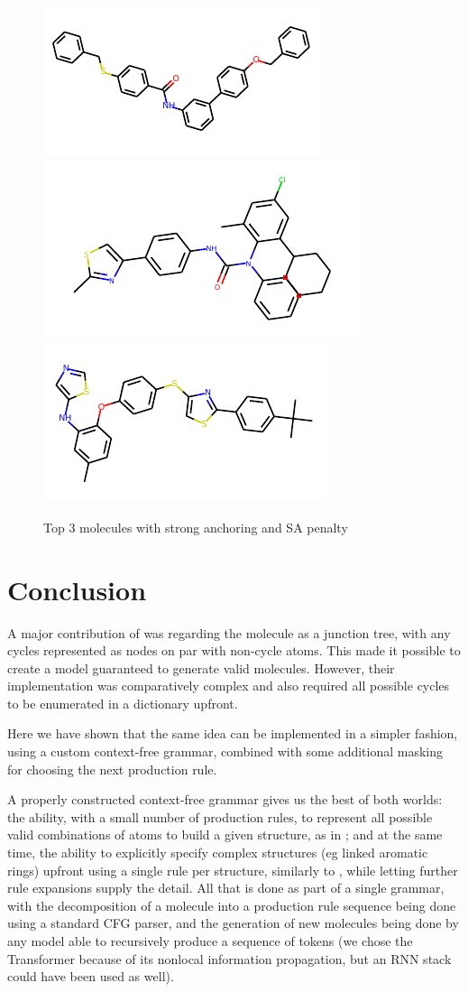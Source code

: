 \documentclass{article}
\begin{document}
\begin{figure}[ht]
	\centering
	\includegraphics[width=0.5\columnwidth]{strong_0.pdf}\includegraphics[width=0.5\columnwidth]{strong_1.pdf}\\
	\includegraphics[width=0.5\columnwidth]{strong_2.pdf}
	\caption{Top 3 molecules with strong anchoring and SA penalty}\label{fig:strong}
\end{figure}


\section{Conclusion}
A major contribution of \cite{jin18} was regarding the molecule as a junction tree, with any cycles represented as nodes on par with non-cycle atoms. This made it possible to create a model guaranteed to generate valid molecules. However, their implementation was comparatively complex and also required all possible cycles to be enumerated in a dictionary upfront. 

Here we have shown that the same idea can be implemented in a simpler fashion, using a custom context-free grammar, combined with some additional masking for choosing the next production rule. 

A properly constructed context-free grammar gives us the best of both worlds: the ability, with a small number of production rules, to represent all possible valid combinations of atoms to build a given structure, as in \cite{kusner17}; and at the same time, the ability to explicitly specify complex structures (eg linked aromatic rings) upfront using a single rule per structure, similarly to \cite{jin18}, while letting further rule expansions supply the detail. All that is done as part of a single grammar, with the decomposition of a molecule into a production rule sequence being done using a standard CFG parser, and the generation of new molecules being done by any model able to recursively produce a sequence of tokens (we chose the Transformer because of its nonlocal information propagation, but an RNN stack could have been used as well).
\end{document}
